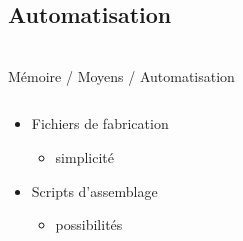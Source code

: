 \subsection{Automatisation}\begin{frame}
{\bititle\\Mémoire / Moyens / Automatisation}
\begin{columns}\begin{column}{.5\textwidth}\begin{itemize}

\item<1-> Fichiers de fabrication\begin{itemize}
    \item<2-> simplicité\end{itemize}\vspace{2em}
\item<3-> Scripts d’assemblage\begin{itemize}
    \item<4-> possibilités\end{itemize}\end{itemize}

\end{column}\begin{column}{.5\textwidth}

\vspace{1em}

\end{column}\end{columns}\end{frame}
